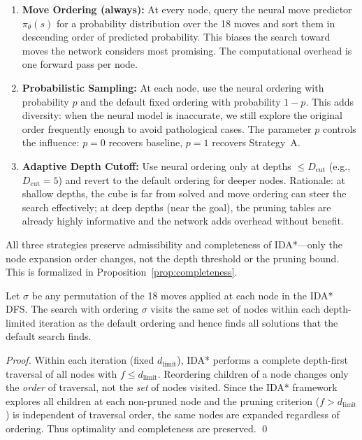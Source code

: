 \documentclass[10pt,twocolumn,a4paper]{article}
\begin{document}
\begin{enumerate}[leftmargin=*]
  \item[\textbf{(A)}] \textbf{Move Ordering (always):} At every node, query the neural move predictor $\pi_\theta(s)$ for a probability distribution over the 18 moves and sort them in descending order of predicted probability. This biases the search toward moves the network considers most promising. The computational overhead is one forward pass per node.
  \item[\textbf{(B)}] \textbf{Probabilistic Sampling:} At each node, use the neural ordering with probability $p$ and the default fixed ordering with probability $1-p$. This adds diversity: when the neural model is inaccurate, we still explore the original order frequently enough to avoid pathological cases. The parameter $p$ controls the influence: $p=0$ recovers baseline, $p=1$ recovers Strategy~A.
  \item[\textbf{(C)}] \textbf{Adaptive Depth Cutoff:} Use neural ordering only at depths $\leq D_{\mathrm{cut}}$ (e.g., $D_{\mathrm{cut}} = 5$) and revert to the default ordering for deeper nodes. Rationale: at shallow depths, the cube is far from solved and move ordering can steer the search effectively; at deep depths (near the goal), the pruning tables are already highly informative and the network adds overhead without benefit.
\end{enumerate}

All three strategies preserve admissibility and completeness of IDA*---only the node expansion order changes, not the depth threshold or the pruning bound. This is formalized in Proposition~\ref{prop:completeness}.

\begin{proposition}
\label{prop:completeness}
Let $\sigma$ be any permutation of the 18 moves applied at each node in the IDA* DFS. The search with ordering $\sigma$ visits the same set of nodes within each depth-limited iteration as the default ordering and hence finds all solutions that the default search finds.
\end{proposition}

\begin{proof}
Within each iteration (fixed $d_{\text{limit}}$), IDA* performs a complete depth-first traversal of all nodes with $f \leq d_{\text{limit}}$. Reordering children of a node changes only the \emph{order} of traversal, not the \emph{set} of nodes visited. Since the IDA* framework explores all children at each non-pruned node and the pruning criterion ($f > d_{\text{limit}}$) is independent of traversal order, the same nodes are expanded regardless of ordering. Thus optimality and completeness are preserved. \qed
\end{proof}
\end{document}
